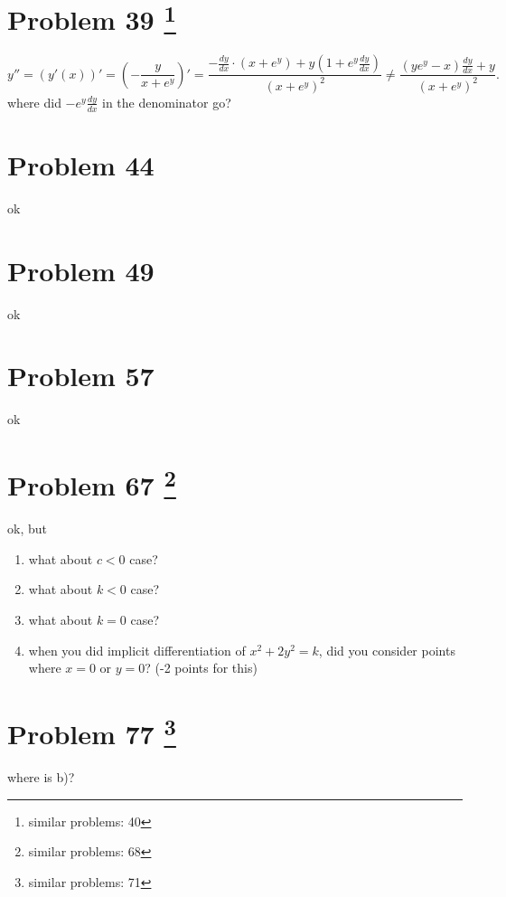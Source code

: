\documentclass[10pt]{article} %
\begin{document}
\section*{Problem 39 \footnote{similar problems: 40}}
\begin{equation*}
	y''=\left( y'(x) \right)'=\left( -\frac{y}{x+e^y} \right)'=\frac{-\frac{dy}{dx}\cdot\left( x+e^y \right)
	+y\left( 1+e^y\frac{dy}{dx} \right)}{\left( x+e^y \right)^2}\neq
	\frac{\left( ye^y-x \right)\frac{dy}{dx}+y}{\left( x+e^y \right)^2}.
\end{equation*}
where did $-e^y\frac{dy}{dx}$ in the denominator go?
\section*{Problem 44 }
ok
\section*{Problem 49 }
ok
\section*{Problem 57 }
ok
\section*{Problem 67 \footnote{similar problems: 68}}
ok, but
\begin{enumerate}
	\item what about $c<0$ case?
	\item what about $k<0$ case?
	\item what about $k=0$ case?
	\item when you did implicit differentiation of $x^2+2y^2=k$, did you consider
		points where $x=0$ or $y=0$? (-2 points for this)
\end{enumerate}
\section*{Problem 77 \footnote{similar problems: 71}}
where is b)?
\end{document}
